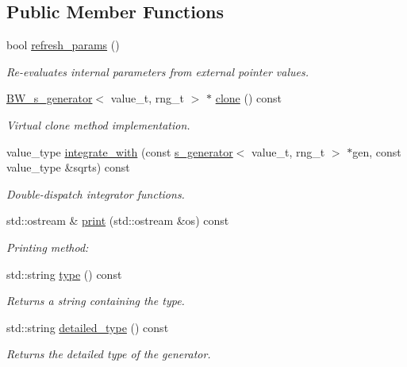 \subsection*{Public Member Functions}
\begin{DoxyCompactItemize}
\item 
bool \hyperlink{a00033_af93b24c888e815837e9cb4d22ac5dbb1}{refresh\-\_\-params} ()
\begin{DoxyCompactList}\small\item\em Re-\/evaluates internal parameters from external pointer values. \end{DoxyCompactList}\item 
\hypertarget{a00033_a38936094f3b1fe9c779e2eae9548233e}{\hyperlink{a00033}{B\-W\-\_\-s\-\_\-generator}$<$ value\-\_\-t, rng\-\_\-t $>$ $\ast$ \hyperlink{a00033_a38936094f3b1fe9c779e2eae9548233e}{clone} () const }\label{a00033_a38936094f3b1fe9c779e2eae9548233e}

\begin{DoxyCompactList}\small\item\em Virtual clone method implementation. \end{DoxyCompactList}\item 
\hypertarget{a00033_a572284155752923568452881ee949422}{value\-\_\-type \hyperlink{a00033_a572284155752923568452881ee949422}{integrate\-\_\-with} (const \hyperlink{a00482}{s\-\_\-generator}$<$ value\-\_\-t, rng\-\_\-t $>$ $\ast$gen, const value\-\_\-type \&sqrts) const }\label{a00033_a572284155752923568452881ee949422}

\begin{DoxyCompactList}\small\item\em Double-\/dispatch integrator functions. \end{DoxyCompactList}\item 
\hypertarget{a00033_a50e4d7dd2bac969f50840876c3cfd5a7}{std\-::ostream \& \hyperlink{a00033_a50e4d7dd2bac969f50840876c3cfd5a7}{print} (std\-::ostream \&os) const }\label{a00033_a50e4d7dd2bac969f50840876c3cfd5a7}

\begin{DoxyCompactList}\small\item\em Printing method\-: \end{DoxyCompactList}\item 
\hypertarget{a00033_a337323444bf358c5c4ffa11fa80d8a85}{std\-::string \hyperlink{a00033_a337323444bf358c5c4ffa11fa80d8a85}{type} () const }\label{a00033_a337323444bf358c5c4ffa11fa80d8a85}

\begin{DoxyCompactList}\small\item\em Returns a string containing the type. \end{DoxyCompactList}\item 
\hypertarget{a00033_afd467eab339367ed17714bd28a0c60a0}{std\-::string \hyperlink{a00033_afd467eab339367ed17714bd28a0c60a0}{detailed\-\_\-type} () const }\label{a00033_afd467eab339367ed17714bd28a0c60a0}

\begin{DoxyCompactList}\small\item\em Returns the detailed type of the generator. \end{DoxyCompactList}\end{DoxyCompactItemize}
